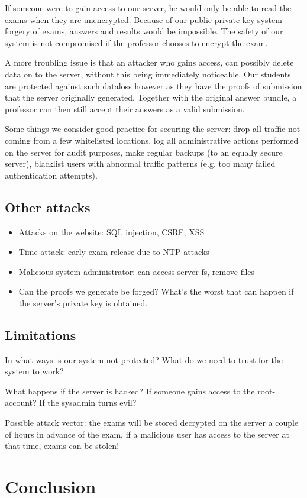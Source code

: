 \documentclass[12pt]{article}
\begin{document}
If someone were to gain access to our server, he would only be able to read the
exams when they are unencrypted. Because of our public-private key system
forgery of exams, answers and results would be impossible. The safety of our
system is not compromised if the professor chooses to encrypt the exam.

A more troubling issue is that an attacker who gains access, can possibly delete
data on to the server, without this being immediately noticeable. Our students
are protected against such dataloss however as they have the proofs of
submission that the server originally generated. Together with the original
answer bundle, a professor can then still accept their answers as a valid
submission.


Some things we consider good practice for securing the server: drop all traffic
not coming from a few whitelisted locations, log all administrative actions
performed on the server for audit purposes, make regular backups (to an equally
secure server), blacklist users with abnormal traffic patterns (e.g. too many
failed authentication attempts).

\subsection{Other attacks}

\begin{itemize}
\item Attacks on the website: SQL injection, CSRF, XSS
\item Time attack: early exam release due to NTP attacks
\item Malicious system administrator: can access server fs, remove files
\item Can the proofs we generate be forged? What's the worst that can happen
if the server's private key is obtained.
\end{itemize}

\subsection{Limitations}
\label{subsec:req-limitations}


In what ways is our system not protected? What do we need to trust for the
system to work?

What happens if the server is hacked? If someone gains access to the
root-account? If the sysadmin turns evil?

Possible attack vector: the exams will be stored decrypted on the server a
couple of hours in advance of the exam, if a malicious user has access to the
server at that time, exams can be stolen!

\section{Conclusion}
\label{sec:conclusion}

\end{document}

